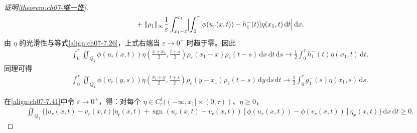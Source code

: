 \documentclass[../../main.tex]{subfiles}%
\begin{document}
\begin{proof}[证明\cref{theorem:ch07-唯一性}]
\begin{align*}
\begin{aligned}
&\quad+\|\rho_1\|_\infty\frac1\varepsilon\int_{x_1-\varepsilon}^{x_1}\Bigl|\int_0^\tau[\phi(u_r(x,t))-h_1^-(t)]\eta(x_1,t)\,\mathrm{d}t\Bigr|\,\mathrm{d}x.
\end{aligned}
\end{align*}
由 $\eta$ 的光滑性与等式\eqref{align:ch07-7.26}，上式右端当 $\varepsilon\to0^+$ 时趋于零。因此
\begin{align*}
\int_0^\tau\iint_{Q_1}\phi(u_r(x,t))\eta\left(\frac{x+x_1}{2},\frac{t+s}{2}\right)\rho_\varepsilon(x_1-x)\rho_\varepsilon(t-s)\,\mathrm{d}x\,\mathrm{d}t\,\mathrm{d}s
\to\frac12\int_0^\tau h_1^-(t)\eta(x_1,t)\,\mathrm{d}t.
\end{align*}
同理可得
\begin{align*}
\int_0^\tau\iint_{Q_1}\phi(v_r(y,s))\eta\left(\frac{x_1+y}{2},\frac{t+s}{2}\right)\rho_\varepsilon(y-x_1)\rho_\varepsilon(t-s)\,\mathrm{d}y\,\mathrm{d}s\,\mathrm{d}t
\to\frac12\int_0^\tau g_1^-(s)\eta(x_1,s)\,\mathrm{d}s.
\end{align*}

在\eqref{align:ch07-7.41}中令 $\varepsilon\to0^+$，得：对每个 $\eta\in C^1_c((-\infty,x_1]\times(0,\tau))$、$\eta\geqslant0$，
\begin{align}
\iint_{Q_1}\{|u_r(x,t)-v_r(x,t)|\eta_t(x,t)+\operatorname{sgn}(u_r(x,t)-v_r(x,t))[\phi(u_r(x,t))-\phi(v_r(x,t))]\eta_x(x,t)\}\,\mathrm{d}x\,\mathrm{d}t\geqslant0. \label{align:ch07-7.42}
\end{align}


\end{proof}
\end{document}
